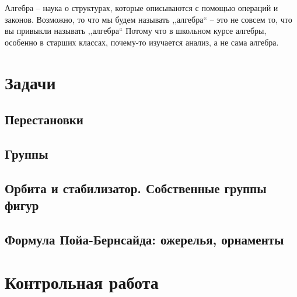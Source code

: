 \documentclass[10pt, twoside]{article}
\begin{document}
\pagestyle{empty}



\newpage

\tableofcontents
\newpage

\setcounter{page}{1}
\pagestyle{fancy}

Алгебра -- наука о структурах, которые описываются с помощью операций и законов. 
Возможно, то что мы будем называть ,,алгебра`` -- это не совсем то, что вы привыкли называть ,,алгебра`` 
Потому что в школьном курсе алгебры, особенно в старших классах, почему-то изучается анализ, а не сама алгебра.


\setcounter{section}{-1}







\newpage
\renewcommand{\thesubsection}{\roman{subsection}}
\setcounter{subsection}{0}

\section*{Задачи}

\subsection{Перестановки}

\subsection{Группы}

\subsection{Орбита и стабилизатор. Собственные группы фигур}
\subsection{Формула Пойа-Бернсайда: ожерелья, орнаменты}
% 
% 
% 

\newpage
{}
\section*{Контрольная работа}
% 
\end{document}
